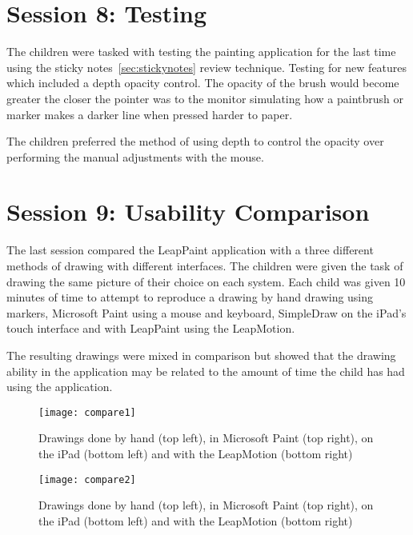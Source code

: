 \section{Session 8: Testing}\label{session8}

The children were tasked with testing the painting application for the last time using the sticky notes~\ref{sec:stickynotes} review technique. Testing for new features which included a depth opacity control. The opacity of the brush would become greater the closer the pointer was to the monitor simulating how a paintbrush or marker makes a darker line when pressed harder to paper. 

The children preferred the method of using depth to control the opacity over performing the manual adjustments with the mouse. 

\section{Session 9: Usability Comparison}\label{session9}
The last session compared the LeapPaint application with a three different methods of drawing with different interfaces. The children were given the task of drawing the same picture of their choice on each system. Each child was given 10 minutes of time to attempt to reproduce a drawing by hand drawing using markers, Microsoft Paint using a mouse and keyboard, SimpleDraw on the iPad's touch interface and with LeapPaint using the LeapMotion. 

The resulting drawings were mixed in comparison but showed that the drawing ability in the application may be related to the amount of time the child has had using the application. 

\begin{figure}
\centering
\texttt{[image: compare1]}

\caption{Drawings done by hand (top left), in Microsoft Paint (top right), on the iPad (bottom left) and with the LeapMotion (bottom right)}
\label{fig:compare1}
\end{figure}

\begin{figure}
\centering
\texttt{[image: compare2]}

\caption{Drawings done by hand (top left), in Microsoft Paint (top right), on the iPad (bottom left) and with the LeapMotion (bottom right)}
\label{fig:compare2}
\end{figure}
